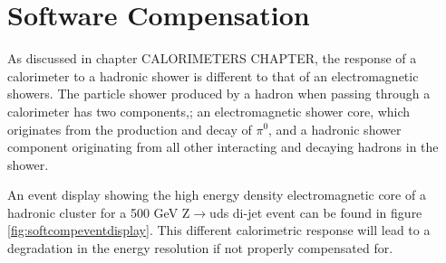 
\section{Software Compensation}
\label{sec:softcomp}
As discussed in chapter CALORIMETERS CHAPTER, the response of a calorimeter to a hadronic shower is different to that of an electromagnetic showers.  The particle shower produced by a hadron when passing through a calorimeter has two components,\cite{Wigmans:2000vf}; an electromagnetic shower core, which originates from the production and decay of $\pi^{0}$, and a hadronic shower component originating from all other interacting and decaying hadrons in the shower.  



An event display showing the high energy density electromagnetic core of a hadronic cluster for a 500 GeV Z$\rightarrow$uds di-jet event can be found in figure \ref{fig:softcompeventdisplay}.  This different calorimetric response will lead to a degradation in the energy resolution if not properly compensated for.  

